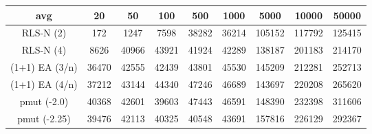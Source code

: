 \begin{tabular}[h]{ccccccccc}
avg&20&50&100&500&1000&5000&10000&50000\\\hline
RLS-N (2)&172&1247&7598&38282&36214&105152&117792&125415\\
RLS-N (4)&8626&40966&43921&41924&42289&138187&201183&214170\\
(1+1) EA (3/n)&36470&42555&42439&43801&45530&145209&212281&252713\\
(1+1) EA (4/n)&37212&43144&44340&47246&46689&143697&220208&265620\\
pmut (-2.0)&40368&42601&39603&47443&46591&148390&232398&311606\\
pmut (-2.25)&39476&42113&40325&40548&43691&157816&226129&292367\\
\end{tabular}
